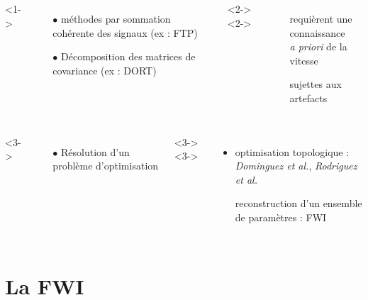 \documentclass[10pt,xcolor=x11names,compress, notes=show]{beamer}%
\begin{document}
\begin{frame}{\insertsectionhead}
\begin{small}
\begin{columns}[c]
	\end{columns}
	\begin{columns}[c]
			<1->
				\begin{itemize}
					\item[$\bullet$] méthodes par sommation cohérente des signaux (ex : FTP)
					\item[$\bullet$] Décomposition des matrices de covariance (ex : DORT)
				\end{itemize}
			<2->
			<2->
				\begin{itemize}
					\item[\ding{55}] requièrent une connaissance\\ \emph{a priori} de la vitesse\\
					\item[\ding{55}] sujettes aux artefacts
				\end{itemize}
	\end{columns}
	\vspace{0.1cm}
	\begin{columns}[c]
		<3->
			\begin{itemize}
				\item[$\bullet$] Résolution d'un problème d'optimisation
			\end{itemize}
		<3->
		<3->
			\begin{itemize}
			\item optimisation topologique :\\\hspace{-0.5cm}\small{\emph{Dominguez et al.}, \emph{Rodriguez et al.}}\\[0.1cm]
			\item[\ding{51}] {reconstruction d'un ensemble de paramètres : FWI}
		\end{itemize}		
	\end{columns}
\end{small}
\end{frame} 


\section{La FWI}
\end{document}
